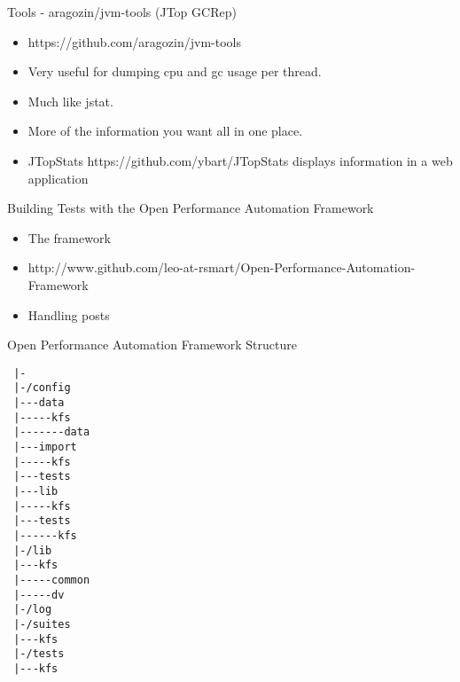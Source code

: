 \documentclass[xcolor=dvipsnames,14pt]{beamer}
\begin{document}
\begin{frame}{Tools - aragozin/jvm-tools (JTop GCRep)}
  \begin{itemize}
  \item https://github.com/aragozin/jvm-tools
  \item Very useful for dumping cpu and gc usage per thread. 
  \item Much like jstat.
  \item More of the information you want all in one place.
  \item JTopStats https://github.com/ybart/JTopStats displays information in a web application
  \end{itemize}
\end{frame}

\begin{frame}{Building Tests with the Open Performance Automation Framework}
  \begin{itemize}
    \item The framework
    \item http://www.github.com/leo-at-rsmart/Open-Performance-Automation-Framework
    \item Handling posts
  \end{itemize}
\end{frame}

\begin{frame}[fragile]{Open Performance Automation Framework Structure}
\begin{verbatim}
 |-
 |-/config
 |---data
 |-----kfs
 |-------data
 |---import
 |-----kfs
 |---tests
 |---lib
 |-----kfs
 |---tests
 |------kfs
 |-/lib
 |---kfs
 |-----common
 |-----dv
 |-/log
 |-/suites
 |---kfs
 |-/tests
 |---kfs
 \end{verbatim}
\end{frame}
\end{document}
